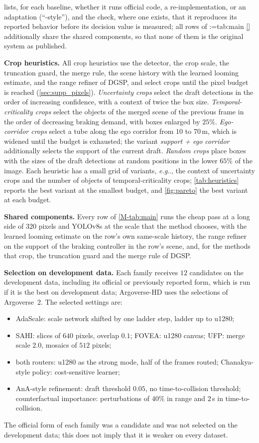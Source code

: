 \documentclass[10pt,letterpaper]{article}
\makeatletter
\DeclareRobustCommand\onedot{\futurelet\@let@token\@onedot}
\def\@onedot{\ifx\@let@token.\else.\null\fi\xspace}
\def\eg{\emph{e.g}\onedot} \def\Eg{\emph{E.g}\onedot}
\newcommand{\method}{DGSP\xspace}
\theoremstyle{remark}
\theoremstyle{plain}
\theoremstyle{definition}
\DeclareRobustCommand{\mref}[1]{\def\mref@list{}\@for\mref@i:=#1\do{\ifx\mref@list\@empty\edef\mref@list{M-\mref@i}\else\edef\mref@list{\mref@list,M-\mref@i}\fi}%
  \edef\mref@cmd{\noexpand\cref*{\mref@list}}\mref@cmd}
\makeatother
\begin{document}
 lists, for each baseline, whether it runs official code, a re-implementation, or an adaptation (``-style''), and the check, where one exists, that it reproduces its reported behavior before its decision value is measured; all rows of \mref{tab:main} additionally share the shared components, so that none of them is the original system as published.

\noindent\textbf{Crop heuristics.}
All crop heuristics use the detector, the crop scale, the truncation guard, the merge rule, the scene history with the learned looming estimate, and the range refiner of \method, and select crops until the pixel budget is reached (\cref{sec:supp_pixels}).
\emph{Uncertainty crops} select the draft detections in the order of increasing confidence, with a context of twice the box size.
\emph{Temporal-criticality crops} select the objects of the merged scene of the previous frame in the order of decreasing braking demand, with boxes enlarged by $25\%$.
\emph{Ego-corridor crops} select a tube along the ego corridor from $10$ to $70$\,m, which is widened until the budget is exhausted; the variant \emph{support + ego corridor} additionally selects the support of the current draft.
\emph{Random crops} place boxes with the sizes of the draft detections at random positions in the lower $65\%$ of the image.
Each heuristic has a small grid of variants, \eg, the context of uncertainty crops and the number of objects of temporal-criticality crops; \cref{tab:heuristics} reports the best variant at the smallest budget, and \cref{fig:pareto} the best variant at each budget.

\noindent\textbf{Shared components.}
Every row of \cref*{M-tab:main} runs the cheap pass at a long side of $320$ pixels and YOLOv8s at the scale that the method chooses, with the learned looming estimate on the row's own same-scale history, the range refiner on the support of the braking controller in the row's scene, and, for the methods that crop, the truncation guard and the merge rule of \method.

\noindent\textbf{Selection on development data.}
Each family receives $12$ candidates on the development data, including its official or previously reported form, which is run if it is the best on development data; Argoverse-HD uses the selections of Argoverse~2.
The selected settings are:
\begin{itemize}[leftmargin=12pt, itemsep=0pt, topsep=1pt]
\item AdaScale: scale network shifted by one ladder step, ladder up to u1280;
\item SAHI: slices of $640$ pixels, overlap $0.1$; FOVEA: u1280 canvas; UFP: merge scale $2.0$, mosaics of $512$ pixels;
\item both routers: u1280 as the strong mode, half of the frames routed; Chanakya-style policy: cost-sensitive learner;
\item AnA-style refinement: draft threshold $0.05$, no time-to-collision threshold; counterfactual importance: perturbations of $40\%$ in range and $2$\,s in time-to-collision.
\end{itemize}
The official form of each family was a candidate and was not selected on the development data; this does not imply that it is weaker on every dataset.
\end{document}
